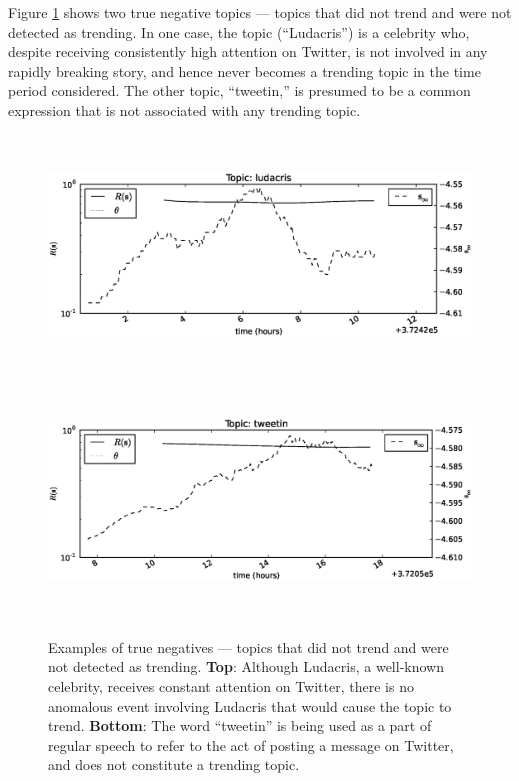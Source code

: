 Figure \ref{fig:examples2} shows two true negative topics --- topics that did
not trend and were not detected as trending. In one case, the topic
(``Ludacris'') is a celebrity who, despite receiving consistently high attention
on Twitter, is not involved in any rapidly breaking story, and hence never
becomes a trending topic in the time period considered. The other topic,
``tweetin,'' is presumed to be a common expression that is not associated with
any trending topic.
\begin{figure}[!h]
\begin{center}
\includegraphics[height=2.5in]{../fig/final/detection_examples/tn/ludacris.eps}
\includegraphics[height=2.5in]{../fig/final/detection_examples/tn/tweetin.eps}
\end{center}
\caption{\label{fig:examples2} Examples of true negatives --- topics that did
  not trend and were not detected as trending. {\bf Top}: Although Ludacris, a
  well-known celebrity, receives constant attention on Twitter, there is no
  anomalous event involving Ludacris that would cause the topic to trend. {\bf
    Bottom}: The word ``tweetin'' is being used as a part of regular speech to
  refer to the act of posting a message on Twitter, and does not constitute a
  trending topic. }
\end{figure}

